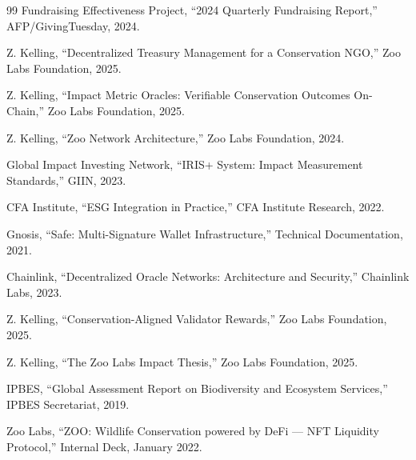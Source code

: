 \documentclass[11pt,letterpaper]{article}
\begin{document}
\begin{thebibliography}{99}
Fundraising Effectiveness Project, ``2024 Quarterly Fundraising Report,'' AFP/GivingTuesday, 2024.

Z. Kelling, ``Decentralized Treasury Management for a Conservation NGO,'' Zoo Labs Foundation, 2025.

Z. Kelling, ``Impact Metric Oracles: Verifiable Conservation Outcomes On-Chain,'' Zoo Labs Foundation, 2025.

Z. Kelling, ``Zoo Network Architecture,'' Zoo Labs Foundation, 2024.

Global Impact Investing Network, ``IRIS+ System: Impact Measurement Standards,'' GIIN, 2023.

CFA Institute, ``ESG Integration in Practice,'' CFA Institute Research, 2022.

Gnosis, ``Safe: Multi-Signature Wallet Infrastructure,'' Technical Documentation, 2021.

Chainlink, ``Decentralized Oracle Networks: Architecture and Security,'' Chainlink Labs, 2023.

Z. Kelling, ``Conservation-Aligned Validator Rewards,'' Zoo Labs Foundation, 2025.

Z. Kelling, ``The Zoo Labs Impact Thesis,'' Zoo Labs Foundation, 2025.

IPBES, ``Global Assessment Report on Biodiversity and Ecosystem Services,'' IPBES Secretariat, 2019.

Zoo Labs, ``ZOO: Wildlife Conservation powered by DeFi --- NFT Liquidity Protocol,'' Internal Deck, January 2022.

\end{thebibliography}
\end{document}
